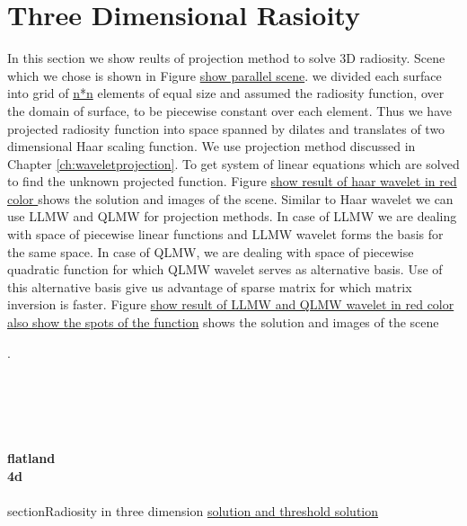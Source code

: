 \section{Three Dimensional Rasioity}
In this section we show reults of projection method to solve 3D radiosity. Scene which we chose is shown in Figure \underline{show parallel  scene}. we divided each surface into grid of  \underline{n*n}  elements of equal size and assumed the radiosity function, over the domain of surface, to be piecewise constant over each element. Thus we have projected radiosity function into space spanned by dilates and translates of two dimensional Haar scaling function. We use projection method discussed in Chapter \ref{ch:waveletprojection}. To get system of linear equations which are solved to find the unknown projected function. Figure \underline{show result of haar wavelet in red color } shows the solution and images of the scene. Similar to Haar wavelet we can use LLMW and QLMW for projection methods. In case of LLMW we are dealing with space of piecewise linear functions and LLMW wavelet forms the basis for the same space. In case of QLMW, we are dealing with space of piecewise quadratic function for which QLMW wavelet serves as alternative basis. Use of this alternative basis give us advantage of sparse matrix for which matrix inversion is faster. Figure    \underline{show result of LLMW and QLMW wavelet in red color also show the spots of the function} shows the solution and images of the scene







.\\\\\\\\\\\\{\bf flatland}\\

{\bf 4d}\\
\\section{Radiosity in three dimension} %
\label{sec:radiosity_in_three_dimension}
\underline{solution and threshold solution}
